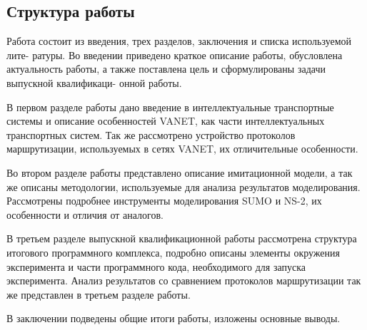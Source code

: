 \subsection*{Структура работы}

Работа состоит из введения, трех разделов, заключения и списка используемой лите-
ратуры. Во введении приведено краткое описание работы, обусловлена актуальность
работы, а также поставлена цель и сформулированы задачи выпускной квалификаци-
онной работы.

В первом разделе работы дано введение в интеллектуальные транспортные системы и описание особенностей VANET, как части интеллектуальных транспортных систем. Так же рассмотрено устройство протоколов маршрутизации, используемых в сетях VANET, их отличительные особенности.

Во втором разделе работы представлено описание имитационной модели, а так же описаны методологии, используемые для анализа результатов моделирования. Рассмотрены подробнее инструменты моделирования SUMO и NS-2, их особенности и отличия от аналогов.

В третьем разделе выпускной квалификационной работы рассмотрена структура итогового программного комплекса, подробно описаны элементы окружения эксперимента и части программного кода, необходимого для запуска эксперимента. Анализ результатов со сравнением протоколов маршрутизации так же представлен в третьем разделе работы.

В заключении подведены общие итоги работы, изложены основные выводы.

